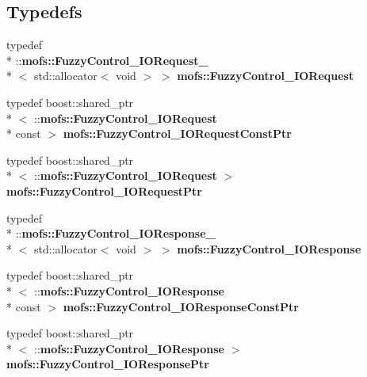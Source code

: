 \subsection*{Typedefs}
\begin{DoxyCompactItemize}
\item 
typedef \\*
\-::{\bf mofs\-::\-Fuzzy\-Control\-\_\-\-I\-O\-Request\-\_\-}\\*
$<$ std\-::allocator$<$ void $>$ $>$ {\bf mofs\-::\-Fuzzy\-Control\-\_\-\-I\-O\-Request}
\item 
typedef boost\-::shared\-\_\-ptr\\*
$<$ \-::{\bf mofs\-::\-Fuzzy\-Control\-\_\-\-I\-O\-Request} \\*
const  $>$ {\bf mofs\-::\-Fuzzy\-Control\-\_\-\-I\-O\-Request\-Const\-Ptr}
\item 
typedef boost\-::shared\-\_\-ptr\\*
$<$ \-::{\bf mofs\-::\-Fuzzy\-Control\-\_\-\-I\-O\-Request} $>$ {\bf mofs\-::\-Fuzzy\-Control\-\_\-\-I\-O\-Request\-Ptr}
\item 
typedef \\*
\-::{\bf mofs\-::\-Fuzzy\-Control\-\_\-\-I\-O\-Response\-\_\-}\\*
$<$ std\-::allocator$<$ void $>$ $>$ {\bf mofs\-::\-Fuzzy\-Control\-\_\-\-I\-O\-Response}
\item 
typedef boost\-::shared\-\_\-ptr\\*
$<$ \-::{\bf mofs\-::\-Fuzzy\-Control\-\_\-\-I\-O\-Response} \\*
const  $>$ {\bf mofs\-::\-Fuzzy\-Control\-\_\-\-I\-O\-Response\-Const\-Ptr}
\item 
typedef boost\-::shared\-\_\-ptr\\*
$<$ \-::{\bf mofs\-::\-Fuzzy\-Control\-\_\-\-I\-O\-Response} $>$ {\bf mofs\-::\-Fuzzy\-Control\-\_\-\-I\-O\-Response\-Ptr}
\end{DoxyCompactItemize}
